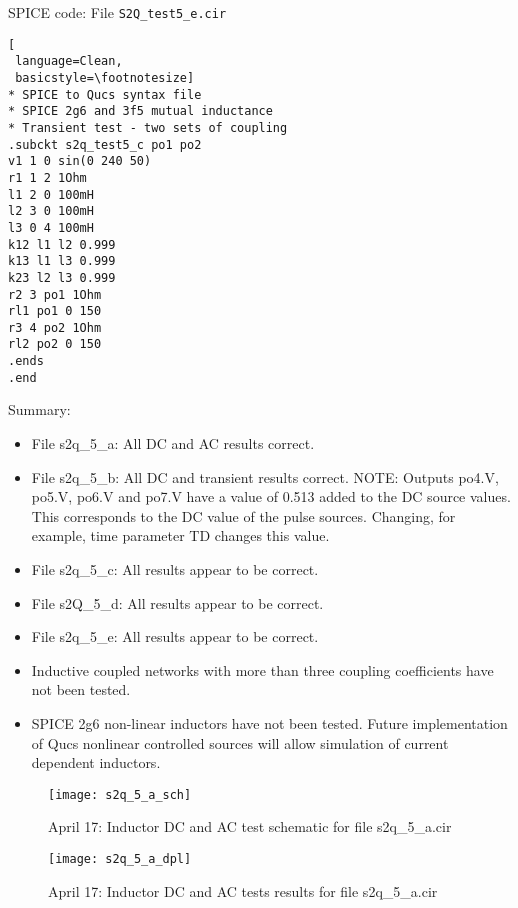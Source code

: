 \begin{flushleft}
SPICE code: File \verb|S2Q_test5_e.cir|
\end{flushleft}

\begin{lstlisting}[
 language=Clean, 
 basicstyle=\footnotesize]
* SPICE to Qucs syntax file
* SPICE 2g6 and 3f5 mutual inductance
* Transient test - two sets of coupling  
.subckt s2q_test5_c po1 po2
v1 1 0 sin(0 240 50)
r1 1 2 1Ohm
l1 2 0 100mH
l2 3 0 100mH
l3 0 4 100mH
k12 l1 l2 0.999
k13 l1 l3 0.999
k23 l2 l3 0.999
r2 3 po1 1Ohm
rl1 po1 0 150
r3 4 po2 1Ohm
rl2 po2 0 150
.ends
.end
\end{lstlisting}


\begin{flushleft}
Summary:
\begin{itemize}
 \item File s2q\_5\_a: All DC and AC results correct.
 \item File s2q\_5\_b: All DC and transient results correct. NOTE: Outputs po4.V, po5.V, po6.V and po7.V have a value of 0.513 added to the DC source values. This corresponds to the DC value of the pulse sources. Changing, for example, time parameter TD changes this value.
 \item File s2q\_5\_c: All results appear to be correct.
 \item File s2Q\_5\_d: All results appear to be correct.
 \item File s2q\_5\_e: All results appear to be correct.
 \item Inductive coupled networks with more than three coupling coefficients have not been tested.
 \item SPICE 2g6 non-linear inductors have not been tested. Future implementation of Qucs nonlinear controlled sources will allow simulation of current dependent inductors.
\end{itemize}

\end{flushleft}

\begin{figure}
  \centering
  \texttt{[image: s2q\_5\_a\_sch]} 
  \caption{April 17: Inductor DC and AC test schematic for file s2q\_5\_a.cir}
  \label{fig:s2q_5_a_sch}
\end{figure} 

\begin{figure}
  \centering
  \texttt{[image: s2q\_5\_a\_dpl]} 
  \caption{April 17: Inductor DC and AC tests results for file s2q\_5\_a.cir}
  \label{fig:s2q_5_a_dpl}
\end{figure} 

